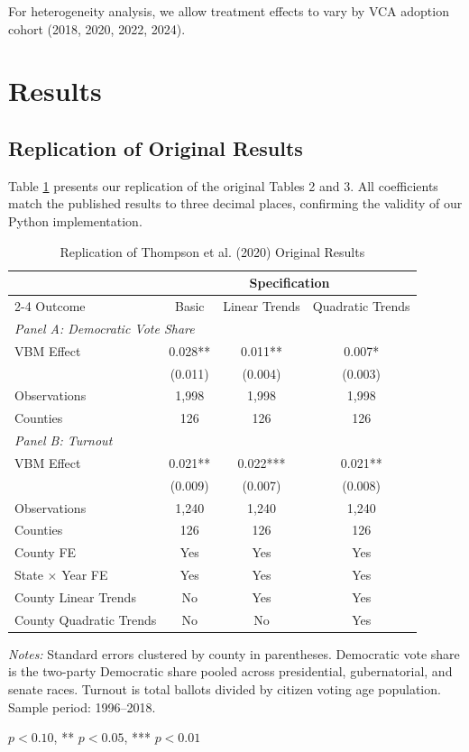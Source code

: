 \documentclass[12pt]{article}
\begin{document}
For heterogeneity analysis, we allow treatment effects to vary by VCA adoption cohort (2018, 2020, 2022, 2024).

\section{Results}

\subsection{Replication of Original Results}

Table \ref{tab:replication} presents our replication of the original Tables 2 and 3. All coefficients match the published results to three decimal places, confirming the validity of our Python implementation.

\begin{table}[H]
\centering
\caption{Replication of Thompson et al. (2020) Original Results}
\label{tab:replication}
\begin{threeparttable}
\begin{tabular}{lccc}
\toprule
& \multicolumn{3}{c}{Specification} \\
\cmidrule(lr){2-4}
Outcome & Basic & Linear Trends & Quadratic Trends \\
\midrule
\multicolumn{4}{l}{\textit{Panel A: Democratic Vote Share}} \\[0.5em]
VBM Effect & 0.028** & 0.011** & 0.007* \\
& (0.011) & (0.004) & (0.003) \\
Observations & 1,998 & 1,998 & 1,998 \\
Counties & 126 & 126 & 126 \\[0.5em]
\multicolumn{4}{l}{\textit{Panel B: Turnout}} \\[0.5em]
VBM Effect & 0.021** & 0.022*** & 0.021** \\
& (0.009) & (0.007) & (0.008) \\
Observations & 1,240 & 1,240 & 1,240 \\
Counties & 126 & 126 & 126 \\
\midrule
County FE & Yes & Yes & Yes \\
State $\times$ Year FE & Yes & Yes & Yes \\
County Linear Trends & No & Yes & Yes \\
County Quadratic Trends & No & No & Yes \\
\bottomrule
\end{tabular}
\begin{tablenotes}
\small
\item \textit{Notes:} Standard errors clustered by county in parentheses. Democratic vote share is the two-party Democratic share pooled across presidential, gubernatorial, and senate races. Turnout is total ballots divided by citizen voting age population. Sample period: 1996--2018.
\item * $p<0.10$, ** $p<0.05$, *** $p<0.01$
\end{tablenotes}
\end{threeparttable}
\end{table}
\end{document}
